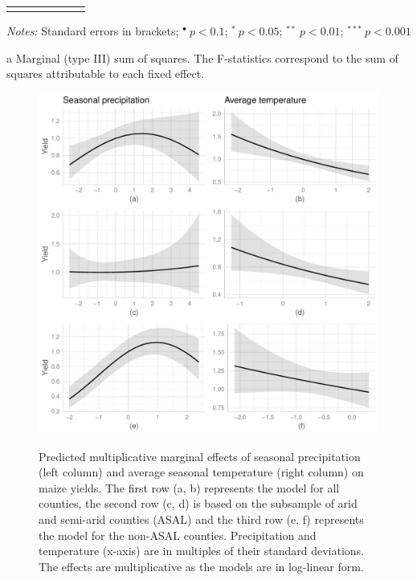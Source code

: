 \documentclass[12pt]{iopart}
\begin{document}
\begin{itemize}
{\begin{threeparttable}
\begin{footnotesize}
\begin{tabular}{llrlllr}
\hline
\vspace{-0.2cm}
\end{tabular} 
\end{footnotesize}
 \begin{tablenotes}
  \begin{footnotesize}
    \item \textit{Notes:} Standard errors in brackets; \hfill $^{\bullet}~p<0.1$; $^{*}~p<0.05$; $^{**}~p<0.01$; $^{***}~p<0.001$
        \begin{adjustwidth}{1cm}{} 
    \item[a] Marginal (type III) sum of squares. The F-statistics correspond to the sum of squares attributable to each fixed effect.
     \end{adjustwidth}
\singlespacing
  \end{footnotesize}
\end{tablenotes}
  \end{threeparttable} 
\par}
\linespread{1}

  \begin{figure}
   \includegraphics{Figure1a_1f.pdf}\label{bar}
\caption{Predicted multiplicative marginal effects of seasonal precipitation (left column) and average seasonal temperature (right column) on maize yields. The first row (a, b) represents the model for all counties, the second row (c, d) is based on the subsample of arid and semi-arid counties (ASAL) and the third row (e, f) represents the model for the non-ASAL counties. Precipitation and temperature (x-axis) are in multiples of their standard deviations. The effects are multiplicative as the models are in log-linear form.}
\end{figure}



\end{itemize}
\end{document}
